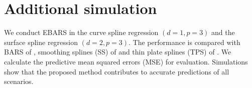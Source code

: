 \section{Additional simulation}

We conduct EBARS in the curve spline regression $(d=1,p=3)$ and the surface spline regression $(d=2,p=3)$. The performance is compared with BARS of \citet{10.1093/biomet/88.4.1055}, smoothing splines (SS) of \citet{green1994nonparametric} and thin plate splines (TPS) of \citet{10.1111/1467-9868.00374}. We calculate the predictive mean squared errors (MSE) for evaluation. Simulations show that the proposed method contributes to accurate predictions of all scenarios.



